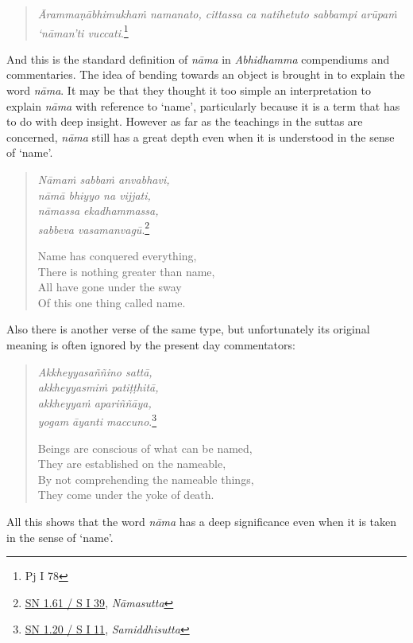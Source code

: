 \begin{quote}
\emph{Ārammaṇābhimukhaṁ namanato, cittassa ca natihetuto sabbampi arūpaṁ `nāman'ti vuccati}.\footnote{Pj I 78}
\end{quote}

And this is the standard definition of \emph{nāma} in \emph{Abhidhamma} compendiums and commentaries. The idea of bending towards an object is brought in to explain the word \emph{nāma}. It may be that they thought it too simple an interpretation to explain \emph{nāma} with reference to `name', particularly because it is a term that has to do with deep insight. However as far as the teachings in the suttas are concerned, \emph{nāma} still has a great depth even when it is understood in the sense of `name'.

\begin{quote}
\emph{Nāmaṁ sabbaṁ anvabhavi,}\\
\emph{nāmā bhiyyo na vijjati,}\\
\emph{nāmassa ekadhammassa,}\\
\emph{sabbeva vasamanvagū}.\footnote{\href{https://suttacentral.net/sn1.61/pli/ms}{SN 1.61 / S I 39}, \emph{Nāmasutta}}

Name has conquered everything,\\
There is nothing greater than name,\\
All have gone under the sway\\
Of this one thing called name.
\end{quote}

Also there is another verse of the same type, but unfortunately its original meaning is often ignored by the present day commentators:

\begin{quote}
\emph{Akkheyyasaññino sattā,}\\
\emph{akkheyyasmiṁ patiṭṭhitā,}\\
\emph{akkheyyaṁ apariññāya,}\\
\emph{yogam āyanti maccuno}.\footnote{\href{https://suttacentral.net/sn1.20/pli/ms}{SN 1.20 / S I 11}, \emph{Samiddhisutta}}

Beings are conscious of what can be named,\\
They are established on the nameable,\\
By not comprehending the nameable things,\\
They come under the yoke of death.
\end{quote}

All this shows that the word \emph{nāma} has a deep significance even when it is taken in the sense of `name'.

